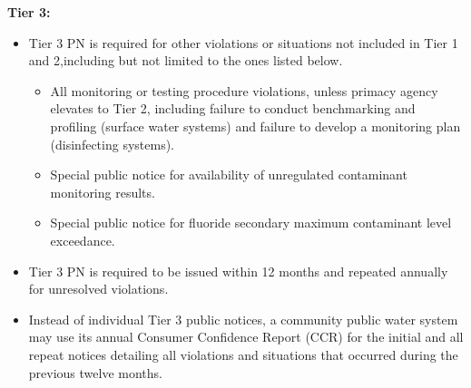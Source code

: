 \vspace{0.2cm}
\textbf{Tier 3:}\\
\begin{itemize}
\item Tier 3 PN is required for other violations or situations not included in Tier 1 and 2,including but not limited to the ones listed below.
\begin{itemize}
\item All monitoring or testing procedure violations, unless primacy agency elevates to Tier 2, including failure to	conduct	benchmarking	and	profiling	(surface	water	systems)	and	failure	to	develop	a	monitoring	plan	(disinfecting systems).
\item  Special public notice for availability of unregulated contaminant monitoring results.
\item Special	public	notice	for	fluoride	secondary	maximum	contaminant	level	 exceedance.
\end{itemize}
\item Tier 3 PN is required to be issued within 12 months and repeated annually for unresolved violations.
\item Instead of individual Tier 3 public notices, a community public water system may use its annual Consumer Confidence Report (CCR) for the initial and all repeat notices detailing all violations and situations that occurred during the previous twelve months.
\end{itemize}

